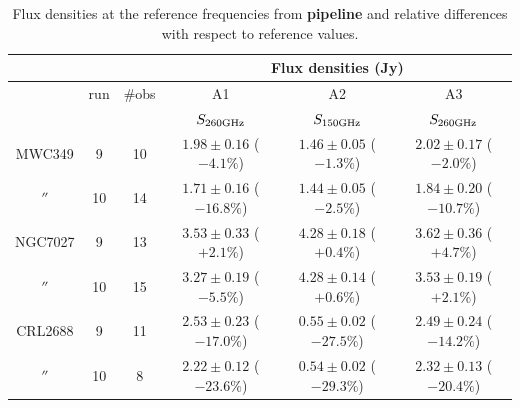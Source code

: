 \begin{table}[bh]
\begin{center}
\begin{tabular}{|c|c|c|c|c|c|}
\hline
\multicolumn{3}{|c}{}  & \multicolumn{3}{|c|}{Flux  densities (Jy)}   \\
\hline\hline
         & run  & \#obs &  A1                        &  A2                        &           A3                  \\
         &      &       &  $S_{260 {\rm GHz}}$       &  $S_{150 {\rm GHz}}$       & $S_{260 {\rm GHz}}$         \\
\hline  
MWC349   &  9   & 10    &  $1.98\pm0.16$ ($-4.1\%$)  &  $1.46\pm0.05$ ($-1.3\%$)  &  $2.02\pm0.17$ ($-2.0\%$)     \\
  $''$   & 10   & 14    &  $1.71\pm0.16$ ($-16.8\%$) & $1.44\pm0.05$ ($-2.5\%$)   &  $1.84\pm0.20$ ($-10.7\%$)      \\ 
  \hline
NGC7027  &  9   & 13    &  $3.53\pm0.33$ ($+2.1\%$)  &  $4.28\pm0.18$ ($+0.4\%$)  & $3.62\pm0.36$ ($+4.7\%$)      \\
  $''$   & 10   & 15    &  $3.27\pm0.19$ ($-5.5\%$)  & $4.28\pm0.14$ ($+0.6\%$)   &  $3.53\pm0.19$ ($+2.1\%$)        \\ 
  \hline
CRL2688  &  9   & 11    &  $2.53\pm0.23$ ($-17.0\%$) &  $0.55\pm0.02$ ($-27.5\%$) &  $2.49\pm0.24$ ($-14.2\%$)    \\
  $''$   & 10   &  8    &  $2.22\pm0.12$ ($-23.6\%$) &  $0.54\pm0.02$ ($-29.3\%$) &  $2.32\pm0.13$ ($-20.4\%$)     \\
\hline
\end{tabular}
\caption{Flux densities at the reference frequencies  from {\bf pipeline} and relative differences  with respect to reference values.}
\label{tab:flux_sec_NK}
\end{center}
\end{table}



\\

\\

